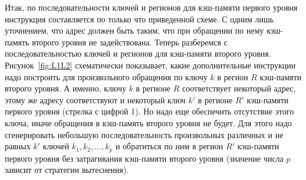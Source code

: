 Итак, по последовательности ключей и регионов для кэш-памяти первого уровня
инструкция составляется по только что приведенной схеме. С одним лишь
уточнением, что адрес должен быть таким, что при обращении по нему кэш-память
второго уровня не задействована. Теперь разберемся с последовательностью ключей
и регионов для кэш-памяти второго уровня. Рисунок~\ref{fig:L1L2} схематически
показывает, какие дополнительные инструкции надо построить для произвольного
обращения по ключу $k$ в регион $R$ кэш-памяти второго уровня. А именно, ключу
$k$ в регионе $R$ соответствует некоторый адрес, этому же адресу соответствуют и
некоторый ключ $k'$ в регионе $R'$ кэш-памяти первого уровня (стрелка с цифрой
1). Но надо еще обеспечить отсутствие этого ключа, иначе обращения в кэш-память
второго уровня не будет. Для этого надо сгенерировать небольшую
последовательность произвольных различных и не равных $k'$ ключей $k_1, k_2,
\dots, k_p$ и обратиться по ним в регион $R'$ кэш-памяти первого уровня без
затрагивания кэш-памяти второго уровня (значение числа $p$ зависит от стратегии
вытеснения).

